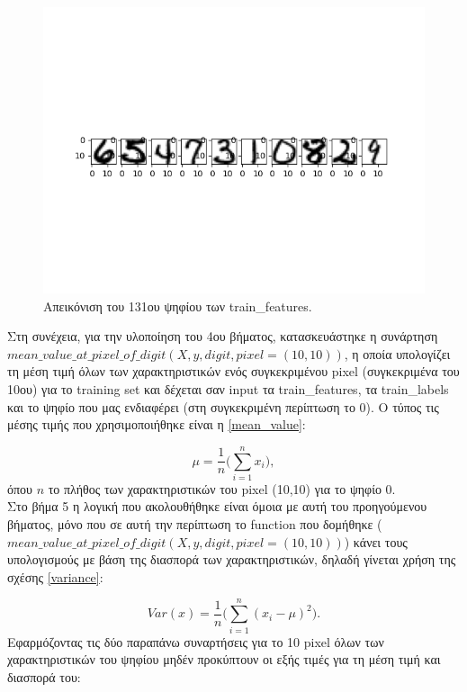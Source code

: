 \documentclass[11pt]{article} %
\begin{document}
\begin{figure}[H]
    \centering
    \includegraphics[width=1.1\textwidth]{plots/Step 3}
    \caption{Απεικόνιση του 131ου ψηφίου των train\_features.}
    \label{fig:step_3}
\end{figure}

Στη συνέχεια, για την υλοποίηση του 4ου βήματος, κατασκευάστηκε η συνάρτηση $mean\_value\_at\_pixel\_of\_digit(X, y, digit, pixel=(10, 10))$, η οποία υπολογίζει τη μέση τιμή όλων των χαρακτηριστικών ενός συγκεκριμένου pixel (συγκεκριμένα του 10ου) για το training set και δέχεται σαν input  τα train\_features, τα train\_labels και το ψηφίο που μας ενδιαφέρει (στη συγκεκριμένη περίπτωση το 0). Ο τύπος τις μέσης τιμής που χρησιμοποιήθηκε είναι η \ref{mean_value}: 

\begin{equation}
\label{mean_value}
\mu = \frac{1}{n}\bigg(\sum_{i=1}^{n}x_{i}\bigg),
\end{equation}
όπου $n$ το πλήθος των χαρακτηριστικών του pixel (10,10) για το ψηφίο 0.
\\

Στο βήμα 5 η λογική που ακολουθήθηκε είναι όμοια με αυτή του προηγούμενου βήματος, μόνο που σε αυτή την περίπτωση το function που δομήθηκε ($mean\_value\_at\_pixel\_of\_digit(X, y, digit, pixel=(10, 10))$) κάνει τους υπολογισμούς με βάση της διασπορά των χαρακτηριστικών, δηλαδή γίνεται χρήση της σχέσης \ref{variance}: 

\begin{equation}
\label{variance}
Var(x) = \frac{1}{n}\bigg(\sum_{i=1}^{n}(x_{i}-\mu)^{2}\bigg).
\end{equation}
Εφαρμόζοντας τις δύο παραπάνω συναρτήσεις για το 10 pixel όλων των χαρακτηριστικών του ψηφίου μηδέν προκύπτουν οι εξής τιμές για τη μέση τιμή και διασπορά του:
\end{document}
